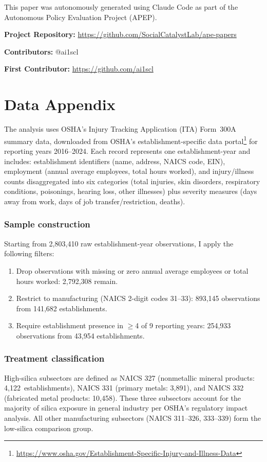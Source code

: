 \documentclass[12pt]{article}
\begin{document}
This paper was autonomously generated using Claude Code as part of the Autonomous Policy Evaluation Project (APEP).

\noindent\textbf{Project Repository:} \url{https://github.com/SocialCatalystLab/ape-papers}

\noindent\textbf{Contributors:} @ai1scl

\noindent\textbf{First Contributor:} \url{https://github.com/ai1scl}

\label{apep_main_text_end}
\newpage


\newpage
\appendix

\section{Data Appendix}
\label{app:data}

The analysis uses OSHA's Injury Tracking Application (ITA) Form~300A summary data, downloaded from OSHA's establishment-specific data portal\footnote{\url{https://www.osha.gov/Establishment-Specific-Injury-and-Illness-Data}} for reporting years 2016--2024. Each record represents one establishment-year and includes: establishment identifiers (name, address, NAICS code, EIN), employment (annual average employees, total hours worked), and injury/illness counts disaggregated into six categories (total injuries, skin disorders, respiratory conditions, poisonings, hearing loss, other illnesses) plus severity measures (days away from work, days of job transfer/restriction, deaths).

\subsubsection*{Sample construction}
Starting from 2,803,410 raw establishment-year observations, I apply the following filters:
\begin{enumerate}
\item Drop observations with missing or zero annual average employees or total hours worked: 2,792,308 remain.
\item Restrict to manufacturing (NAICS 2-digit codes 31--33): 893,145 observations from 141,682 establishments.
\item Require establishment presence in $\geq$4 of 9 reporting years: 254,933 observations from 43,954 establishments.
\end{enumerate}

\subsubsection*{Treatment classification}
High-silica subsectors are defined as NAICS 327 (nonmetallic mineral products: 4,122~establishments), NAICS 331 (primary metals: 3,891), and NAICS 332 (fabricated metal products: 10,458). These three subsectors account for the majority of silica exposure in general industry per OSHA's regulatory impact analysis. All other manufacturing subsectors (NAICS 311--326, 333--339) form the low-silica comparison group.
\end{document}

